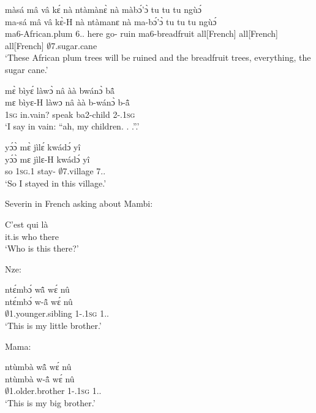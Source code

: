 \begin{exe}[(C234)]  
\exC\label{82}
  \glll  màsá mâ vâ kɛ́ nà ntàmànɛ̀ nà màbɔ́'ɔ̀ tu tu tu ngùɔ́ \\
          ma-sá mâ vâ kɛ̀-H nà ntàmanɛ nà ma-bɔ́'ɔ̀ tu tu tu ngùɔ́ \\
          ma6-African.plum 6.{\DEM}.{\PROX} here go-{\R} {\CONJ} ruin {\CONJ} ma6-breadfruit all[French] all[French] all[French] $\emptyset$7.sugar.cane\\ 
    \trans `These African plum trees will be ruined and the breadfruit trees, everything, the sugar cane.'
 
\exC\label{83}
  \glll   mɛ̀ bìyɛ́ làwɔ̀ nâ àà bwánɔ̀ bã̂ \\
           mɛ bìyɛ-H làwɔ nâ àà b-wánɔ̀ b-ã̂ \\
          1\textsc{sg} in.vain? speak {\COMP} {\EXCL} ba2-child 2-{\POSS}.1\textsc{sg} \\
    \trans `I say in vain: ``ah, my children. . .''.'
 
\exC\label{84} 
  \glll  yɔ́ɔ̀ mɛ̀ jìlɛ́ kwádɔ́ yî \\
         yɔ́ɔ̀ mɛ jìlɛ-H kwádɔ́ yî \\
          so 1\textsc{sg}.{\PST}1 stay-{\R} $\emptyset$7.village 7.{\DEM}.{\PROX}  \\
    \trans `So I stayed in this village.'
\end{exe}

\noindent Severin in French asking about Mambi:

\begin{exe}[(C234)]  
\exC\label{85}
  \gll  C'est qui là  \\
          it.is who there  \\
    \trans `Who is this there?'
\end{exe}

\noindent Nze:

\begin{exe}[(C234)] 
\exC\label{86} 
  \glll  ntɛ́mbɔ́ wã̂ wɛ́ nû \\
       ntɛ́mbɔ́ w-ã̂ wɛ́ nû \\
          $\emptyset$1.younger.sibling 1-{\POSS}.1\textsc{sg} {\ID} 1.{\DEM}.{\PROX}  \\
    \trans `This is my little brother.'
\end{exe}

\noindent Mama:

\begin{exe}[(C234)]  
\exC\label{87} 
  \glll  ntùmbà wã̂ wɛ́ nû \\
       ntùmbà w-ã̂ wɛ́ nû \\
         $\emptyset$1.older.brother 1-{\POSS}.1\textsc{sg} {\ID} 1.{\DEM}.{\PROX}  \\
    \trans `This is my big brother.'
\end{exe}


